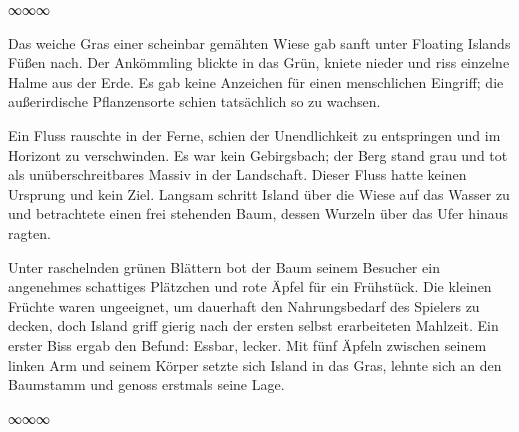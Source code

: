 \begin{center}
∞∞∞
\end{center}

Das weiche Gras einer scheinbar gemähten Wiese gab sanft unter Floating Islands Füßen nach. Der Ankömmling blickte in das Grün, kniete nieder und riss einzelne Halme aus der Erde. Es gab keine Anzeichen für einen menschlichen Eingriff; die außerirdische Pflanzensorte schien tatsächlich so zu wachsen.

Ein Fluss rauschte in der Ferne, schien der Unendlichkeit zu entspringen und im Horizont zu verschwinden. Es war kein Gebirgsbach; der Berg stand grau und tot als unüberschreitbares Massiv in der Landschaft. Dieser Fluss hatte keinen Ursprung und kein Ziel. Langsam schritt Island über die Wiese auf das Wasser zu und betrachtete einen frei stehenden Baum, dessen Wurzeln über das Ufer hinaus ragten.

Unter raschelnden grünen Blättern bot der Baum seinem Besucher ein angenehmes schattiges Plätzchen und rote Äpfel für ein Frühstück. Die kleinen Früchte waren ungeeignet, um dauerhaft den Nahrungsbedarf des Spielers zu decken, doch Island griff gierig nach der ersten selbst erarbeiteten Mahlzeit. Ein erster Biss ergab den Befund: Essbar, lecker. Mit fünf Äpfeln zwischen seinem linken Arm und seinem Körper setzte sich Island in das Gras, lehnte sich an den Baumstamm und genoss erstmals seine Lage.

\begin{center}
∞∞∞
\end{center}

